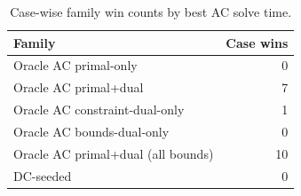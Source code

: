 \begin{table}[!t]
\centering
\caption{Case-wise family win counts by best AC solve time.}
\label{tab:family_wins}
\small
\begin{tabular}{lr}
\toprule
Family & Case wins \\
\midrule
Oracle AC primal-only & 0 \\
Oracle AC primal+dual & 7 \\
Oracle AC constraint-dual-only & 1 \\
Oracle AC bounds-dual-only & 0 \\
Oracle AC primal+dual (all bounds) & 10 \\
DC-seeded & 0 \\
\bottomrule
\end{tabular}
\end{table}